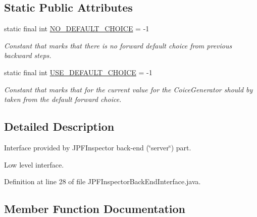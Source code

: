 \subsection*{Static Public Attributes}
\begin{DoxyCompactItemize}
\item 
static final int \hyperlink{interfacegov_1_1nasa_1_1jpf_1_1inspector_1_1interfaces_1_1_choice_generators_interface_a96ec402a57d2b3547337e677e23075cd}{N\+O\+\_\+\+D\+E\+F\+A\+U\+L\+T\+\_\+\+C\+H\+O\+I\+CE} = -\/1
\begin{DoxyCompactList}\small\item\em Constant that marks that there is no forward default choice from previous backward steps. \end{DoxyCompactList}\item 
static final int \hyperlink{interfacegov_1_1nasa_1_1jpf_1_1inspector_1_1interfaces_1_1_choice_generators_interface_ac57a2bb0eb101be2c2b27bd19cb81ea7}{U\+S\+E\+\_\+\+D\+E\+F\+A\+U\+L\+T\+\_\+\+C\+H\+O\+I\+CE} = -\/1
\begin{DoxyCompactList}\small\item\em Constant that marks that for the current value for the Coice\+Generator should by taken from the default forward choice. \end{DoxyCompactList}\end{DoxyCompactItemize}


\subsection{Detailed Description}
Interface provided by J\+P\+F\+Inspector back-\/end (\char`\"{}server\char`\"{}) part. 

Low level interface. 

Definition at line 28 of file J\+P\+F\+Inspector\+Back\+End\+Interface.\+java.



\subsection{Member Function Documentation}
